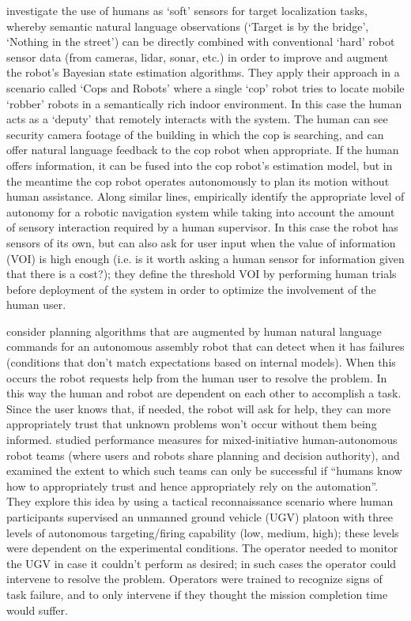 \citet{Sweet2016-dw} investigate the use of  humans as `soft' sensors for target localization tasks, whereby semantic natural language observations (`Target is by the bridge', `Nothing in the street') can be directly combined with conventional `hard' robot sensor data (from cameras, lidar, sonar, etc.) in order to improve and augment the robot's Bayesian state estimation algorithms. 
They apply their approach in a scenario called `Cops and Robots' where a single `cop' robot tries to locate mobile `robber' robots in a semantically rich indoor environment. 
In this case the human acts as a `deputy' that remotely interacts with the system. The human can see security camera footage of the building in which the cop is searching, and can offer natural language feedback to the cop robot when appropriate. If the human offers information, it can be fused into the cop robot's estimation model, but in the meantime the cop robot operates autonomously to plan its motion without human assistance. 
Along similar lines, \citet{Kaupp2008-yr} empirically identify the appropriate level of autonomy for a robotic navigation system while taking into account the amount of sensory interaction required by a human supervisor. In this case the robot has sensors of its own, but can also ask for user input when the value of information (VOI) is high enough (i.e. is it worth asking a human sensor for information given that there is a cost?); they define the threshold VOI by performing human trials before deployment of the system in order to optimize the involvement of the human user.

\citet{Tellex2014-uc} consider planning algorithms that are augmented by human natural language commands for an autonomous assembly robot that can detect when it has failures (conditions that don't match expectations based on internal models). When this occurs the robot requests help from the human user to resolve the problem. In this way the human and robot are dependent on each other to accomplish a task. Since the user knows that, if needed, the robot will ask for help, they can more appropriately trust that unknown problems won't occur without them being informed.
\citet{Freedy2007-sg} studied performance measures for  mixed-initiative human-autonomous robot teams (where users and robots share planning and decision authority), and examined the extent to which such teams can only be successful if ``humans know how to appropriately trust and hence appropriately rely on the automation''. They explore this idea by using a tactical reconnaissance scenario where human participants supervised an unmanned ground vehicle (UGV)  platoon with three levels of autonomous targeting/firing capability (low, medium, high); these levels were dependent on the experimental conditions. The operator needed to monitor the UGV in case it couldn't perform as desired; in such cases the operator could intervene to resolve the problem. Operators were trained to recognize signs of task failure, and to only intervene if they thought the mission completion time would suffer. 

